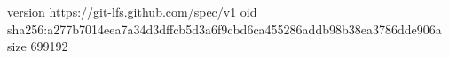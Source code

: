 version https://git-lfs.github.com/spec/v1
oid sha256:a277b7014eea7a34d3dffcb5d3a6f9cbd6ca455286addb98b38ea3786dde906a
size 699192
